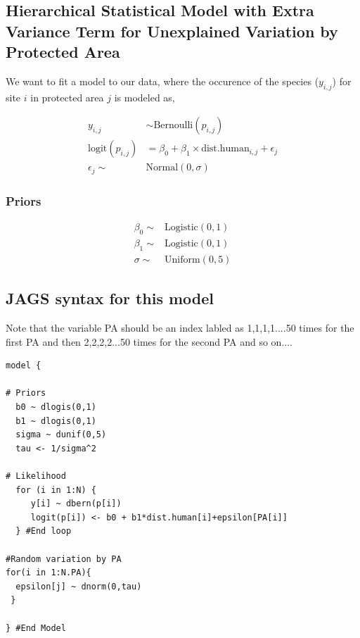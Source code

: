 \documentclass[12pt]{article}
\begin{document}
\subsection{Hierarchical Statistical Model with Extra Variance Term for Unexplained Variation by Protected Area}

\Large

We want to fit a model to our data, where the occurence of the species ($y_{i,j}$) for site $i$ in protected area $j$ is modeled as,

\begin{align*}
y_{i,j} &\sim \text{Bernoulli}(p_{i,j})\\
\text{logit}(p_{i,j}) &= \beta_{0} + \beta_{1}\times \text{dist.human}_{i,j}+ \epsilon_{j}\\
\epsilon_{j} \sim& \text{Normal}(0,\sigma)
\end{align*}

\subsubsection{Priors}

\begin{align*}
\beta_{0} \sim& \text{Logistic}(0, 1)\\
\beta_{1} \sim& \text{Logistic}(0, 1)\\
\sigma \sim& \text{Uniform}(0,5)
\end{align*}


\pagebreak

\subsection{JAGS syntax for this model}

Note that the variable PA should be an index labled as 1,1,1,1....50 times for the first PA and then 2,2,2,2...50 times for the second PA and so on....

\begin{verbatim}
model {

# Priors
  b0 ~ dlogis(0,1)
  b1 ~ dlogis(0,1)
  sigma ~ dunif(0,5)
  tau <- 1/sigma^2

# Likelihood
  for (i in 1:N) {
     y[i] ~ dbern(p[i])
     logit(p[i]) <- b0 + b1*dist.human[i]+epsilon[PA[i]]
  } #End loop

#Random variation by PA
for(i in 1:N.PA){
  epsilon[j] ~ dnorm(0,tau)
 }
 
} #End Model
\end{verbatim}
\end{document}

